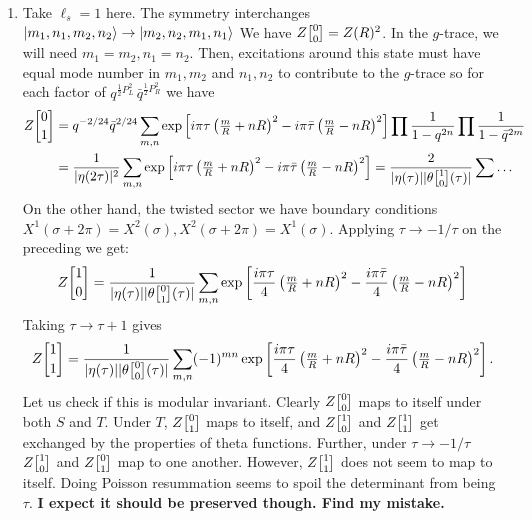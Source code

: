 \documentclass[11pt]{article}
\begin{document}
\begin{enumerate}
	
	\item Take $\ell_s = 1$ here. The symmetry interchanges $\ket{m_1, n_1, m_2, n_2} \to \ket{m_2, n_2, m_1, n_1}$ We have $Z\twist00 = Z(R)^2$. In the $g$-trace, we will need $m_1 = m_2, n_1 = n_2$. Then, excitations around this state must have equal mode number in $m_1, m_2$ and $n_1, n_2$ to contribute to the $g$-trace so for each factor of $q^{\frac12 P_L^2} \, \bar q^{\frac12 P_R^2}$ we have
	\[
	\begin{aligned}
		Z\twist01 &= q^{-2/24} \bar q^{2/24} \sum_{m, n} \exp\left[i \pi \tau \left( \tfrac{m}{R} + n R \right)^2 - i \pi \bar \tau \left( \tfrac{m}{R} - n R \right)^2  \right] \prod \frac{1}{1-q^{2n}} \prod \frac1{1-\bar q^{2m}}\\
		& = \frac{1}{|\eta(2 \tau)|^2}  \sum_{m, n} \exp\left[i \pi \tau \left( \tfrac{m}{R} + n R \right)^2 - i \pi \bar \tau \left( \tfrac{m}{R} - n R \right)^2  \right] = \frac{2}{|\eta(\tau)| |\theta\twist10(\tau)|} \sum \dots
	\end{aligned}
	\]
	On the other hand, the twisted sector we have boundary conditions $X^1(\sigma+2\pi) = X^2(\sigma), X^2(\sigma+2\pi) = X^1(\sigma)$. Applying $\tau \to -1/\tau$ on the preceding we get:
	\[
		Z\twist10 = \frac{1}{|\eta(\tau)| |\theta\twist01(\tau)|} \sum_{m, n}  \exp\left[\frac{i \pi \tau}{4} \left( \tfrac{m}{R} + n R \right)^2 - \frac{i \pi \bar \tau}{4} \left( \tfrac{m}{R} - n R \right)^2  \right] 
	\]
	Taking $\tau \to \tau+1$ gives
	\[
		Z\twist11 = \frac{1}{|\eta(\tau)| |\theta\twist00(\tau)|}\sum_{m, n} (-1)^{mn} \exp\left[\frac{i \pi \tau}{4} \left( \tfrac{m}{R} + n R \right)^2 - \frac{i \pi \bar \tau}{4} \left( \tfrac{m}{R} - n R \right)^2  \right].
	\]
	Let us check if this is modular invariant. Clearly $Z\twist00$ maps to itself under both $S$ and $T$. Under $T$, $Z\twist01$ maps to itself, and $Z\twist10$ and $Z\twist11$ get exchanged by the properties of theta functions. Further, under $\tau \to -1/\tau$ $Z\twist10$ and $Z\twist01$ map to one another. However, $Z\twist11$ does not seem to map to itself. Doing Poisson resummation seems to spoil the determinant from being $\tau$. \textbf{I expect it should be preserved though. Find my mistake.}
	

\end{enumerate}
\end{document}
